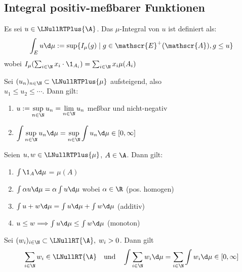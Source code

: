 \documentclass[11pt, a4paper]{article}
\begin{document}
\subsection{Integral positiv-meßbarer Funktionen}

\begin{definition}
    Es sei $u\in \LNullRTPlus{\A}$. Das $\mu$-Integral von $u$ ist definiert als:
    $$\int_E u \d\mu := \sup\{I_\mu(g)\; |\; g\in \mathscr{E}^+(\mathscr{A}), g\leq u\}$$
    wobei $I_\mu(\sum_{i\in \N} x_i \cdot \1_{A_i}) = \sum_{i\in \N} x_i \mu(A_i)$
\end{definition}

\begin{theorem} 
Sei $(u_n)_{n\in \N} \subset \LNullRTPlus{\mu}$ aufsteigend, also\\ $u_1\leq u_2\leq \cdots$. Dann gilt:

\begin{enumerate}[label=\roman*.]
    \item $\displaystyle u:= \sup_{n\in\N} u_n = \lim_{n\in \N} u_n$ meßbar und nicht-negativ
    \item $\displaystyle \int \sup_{n\in \N} u_n \d\mu = \sup_{n\in\N} \int u_n \d\mu \in [0,\infty]$
\end{enumerate}
\end{theorem}

\begin{lemma} \Theorem
    Seien $u,w\in \LNullRTPlus{\mu}$, $A\in \A$. Dann gilt:
    \begin{enumerate}
        \item $\int \1_A \d\mu$ = $\mu(A)$
        \item $\int \alpha u \d\mu = \alpha \int u \d\mu$ wobei $\alpha \in \R$ (pos. homogen)
        \item $\int u+w \d\mu = \int u\d\mu +\int w \d \mu $ (additiv)
        \item $u\leq w \Longrightarrow \int u \d\mu \leq \int w \d \mu$ (monoton)
    \end{enumerate}
\end{lemma}

\begin{lemma}
    Sei $(w_i)_{i\in \N} \subset \LNullRT{\A}, \; w_i > 0$. Dann gilt
    $$\sum_{i\in \N} w_i\in \LNullRT{\A} \quad \text{und} \quad \int \sum_{i\in \N} w_i \d\mu = \sum_{i\in \N} \int w_i \d\mu \in [0,\infty]$$
\end{lemma}
\end{document}
